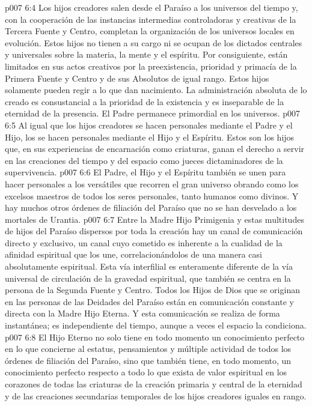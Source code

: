 \vs p007 6:4 Los hijos creadores salen desde el Paraíso a los universos del tiempo y, con la cooperación de las instancias intermedias controladoras y creativas de la Tercera Fuente y Centro, completan la organización de los universos locales en evolución. Estos hijos no tienen a su cargo ni se ocupan de los dictados centrales y universales sobre la materia, la mente y el espíritu. Por consiguiente, están limitados en sus actos creativos por la preexistencia, prioridad y primacía de la Primera Fuente y Centro y de sus Absolutos de igual rango. Estos hijos solamente pueden regir a lo que dan nacimiento. La administración absoluta de lo creado es consustancial a la prioridad de la existencia y es inseparable de la eternidad de la presencia. El Padre permanece primordial en los universos.
\vs p007 6:5 \pc Al igual que los hijos creadores se hacen personales mediante el Padre y el Hijo, los  se hacen personales mediante el Hijo y el Espíritu. Estos son los hijos que, en sus experiencias de encarnación como criaturas, ganan el derecho a servir en las creaciones del tiempo y del espacio como jueces dictaminadores de la supervivencia.
\vs p007 6:6 \pc El Padre, el Hijo y el Espíritu también se unen para hacer personales a los versátiles  que recorren el gran universo obrando como los excelsos maestros de todos los seres personales, tanto humanos como divinos. Y hay muchos otros órdenes de filiación del Paraíso que no se han desvelado a los mortales de Urantia.
\vs p007 6:7 \pc Entre la Madre Hijo Primigenia y estas multitudes de hijos del Paraíso dispersos por toda la creación hay un canal de comunicación directo y exclusivo, un canal cuyo cometido es inherente a la cualidad de la afinidad espiritual que los une, correlacionándolos de una manera casi absolutamente espiritual. Esta vía interfilial es enteramente diferente de la vía universal de circulación de la gravedad espiritual, que también se centra en la persona de la Segunda Fuente y Centro. Todos los Hijos de Dios que se originan en las personas de las Deidades del Paraíso están en comunicación constante y directa con la Madre Hijo Eterna. Y esta comunicación se realiza de forma instantánea; es independiente del tiempo, aunque a veces el espacio la condiciona.
\vs p007 6:8 El Hijo Eterno no solo tiene en todo momento un conocimiento perfecto en lo que concierne al estatus, pensamientos y múltiple actividad de todos los órdenes de filiación del Paraíso, sino que también tiene, en todo momento, un conocimiento perfecto respecto a todo lo que exista de valor espiritual en los corazones de todas las criaturas de la creación primaria y central de la eternidad y de las creaciones secundarias temporales de los hijos creadores iguales en rango.
